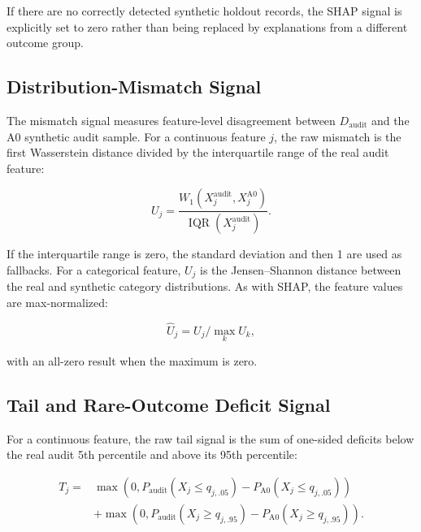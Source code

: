 If there are no correctly detected synthetic holdout records, the SHAP signal
is explicitly set to zero rather than being replaced by explanations from a
different outcome group.

\subsection{Distribution-Mismatch Signal}
\label{subsec:mismatch_signal}

The mismatch signal measures feature-level disagreement between
$D_{\mathrm{audit}}$ and the A0 synthetic audit sample. For a continuous
feature $j$, the raw mismatch is the first Wasserstein distance divided by the
interquartile range of the real audit feature:

\begin{equation}
    U_j =
    \frac{W_1(X^{\mathrm{audit}}_j,X^{\mathrm{A0}}_j)}
         {\operatorname{IQR}(X^{\mathrm{audit}}_j)}.
    \label{eq:continuous_mismatch}
\end{equation}

If the interquartile range is zero, the standard deviation and then 1 are used
as fallbacks. For a categorical feature, $U_j$ is the Jensen--Shannon distance
between the real and synthetic category distributions. As with SHAP, the
feature values are max-normalized:

\begin{equation}
    \widehat{U}_j = U_j / \max_k U_k,
\end{equation}

with an all-zero result when the maximum is zero.

\subsection{Tail and Rare-Outcome Deficit Signal}
\label{subsec:tail_signal}

For a continuous feature, the raw tail signal is the sum of one-sided deficits
below the real audit 5th percentile and above its 95th percentile:

\begin{equation}
\begin{split}
    T_j ={}& \max\!\left(0,
        P_{\mathrm{audit}}(X_j\le q_{j,.05})
        -P_{\mathrm{A0}}(X_j\le q_{j,.05})\right)\\
        &+\max\!\left(0,
        P_{\mathrm{audit}}(X_j\ge q_{j,.95})
        -P_{\mathrm{A0}}(X_j\ge q_{j,.95})\right).
\end{split}
\label{eq:tail_deficit}
\end{equation}

